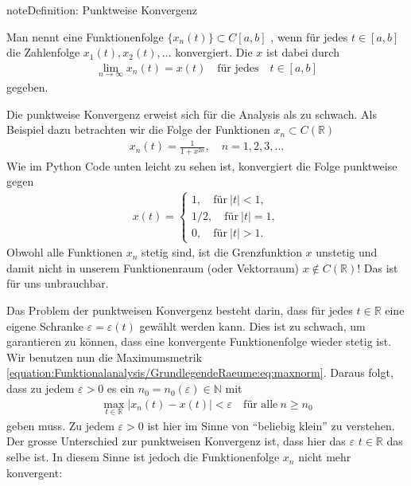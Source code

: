 \documentclass[letterpaper,10pt,english]{jupyterBook}
\begin{document}
\begin{sphinxadmonition}{note}{Definition: Punktweise Konvergenz}

Man nennt eine Funktionenfolge \(\{x_n(t)\} \subset C[a,b]\) , wenn für jedes \(t\in [a,b]\) die Zahlenfolge \(x_1(t), x_2(t), \ldots \) konvergiert. Die  \(x\) ist dabei durch
\begin{equation*}
\begin{split}\lim_{n\to\infty} x_n(t) = x(t)\quad\text{für jedes}\quad t\in [a,b]\end{split}
\end{equation*}
gegeben.
\end{sphinxadmonition}

Die punktweise Konvergenz erweist sich für die Analysis als zu schwach. Als Beispiel dazu betrachten wir die Folge der Funktionen \(x_n \subset C(\mathbb{R})\)
\begin{equation*}
\begin{split}x_n(t) = \frac{1}{1+x^{2n}},\quad n=1,2,3,\ldots\end{split}
\end{equation*}
Wie im Python Code unten leicht zu sehen ist, konvergiert die Folge punktweise gegen
\begin{equation*}
\begin{split}x(t) = \begin{cases}
1,\quad \text{für}\ |t| < 1,\\
1/2, \quad \text{für}\ |t| = 1,\\
0, \quad \text{für}\ |t| > 1.\end{cases}\end{split}
\end{equation*}
Obwohl alle Funktionen \(x_n\) stetig sind, ist die Grenzfunktion \(x\) unstetig und damit nicht in unserem Funktionenraum (oder Vektorraum) \(x\not\in C(\mathbb{R})\)! Das ist für uns unbrauchbar.

\noindent{}

Das Problem der punktweisen Konvergenz besteht darin, dass für jedes \(t\in\mathbb{R}\) eine eigene Schranke \(\varepsilon = \varepsilon(t)\) gewählt werden kann. Dies ist zu schwach, um garantieren zu können, dass eine konvergente Funktionenfolge wieder stetig ist. Wir benutzen nun die Maximumsmetrik \eqref{equation:Funktionalanalysis/GrundlegendeRaeume:eq:maxnorm}. Daraus folgt, dass zu jedem \(\varepsilon > 0\) es ein \(n_0 = n_0(\varepsilon) \in \mathbb{N}\) mit
\begin{equation*}
\begin{split}\max_{t\in\mathbb{R}} |x_n(t) - x(t)| < \varepsilon\quad \text{für alle}\ n \ge n_0\end{split}
\end{equation*}
geben muss. Zu jedem \(\varepsilon > 0\) ist hier im Sinne von “beliebig klein” zu verstehen. Der grosse Unterschied zur punktweisen Konvergenz ist, dass hier das \(\varepsilon\)  \(t\in\mathbb{R}\) das selbe ist. In diesem Sinne ist jedoch die Funktionenfolge \(x_n\) nicht mehr konvergent:
\end{document}
